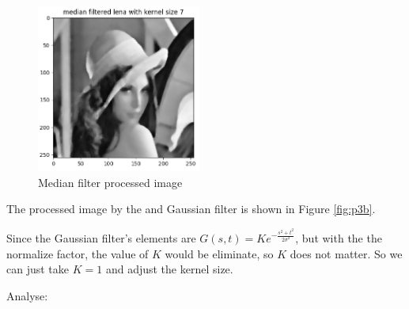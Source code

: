 \begin{figure}[htbp]
	\includegraphics[width=0.48\textwidth]{../images/p3/p3a_7x7.png}
    \caption{Median filter processed image}
\label{fig:p3a}
\end{figure}

The processed image by the and Gaussian filter is shown in Figure \ref{fig:p3b}.

Since the Gaussian filter's elements are $G(s,t)=Ke^{-\frac{s^2+t^2}{2\sigma^2}}$, but with the the normalize factor, the value of
$K$ would be eliminate, so $K$ does not matter. So we can just take $K=1$ and adjust the kernel size.

Analyse:


